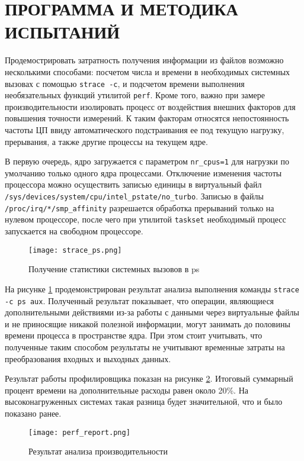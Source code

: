\pagebreak
\section{ПРОГРАММА И МЕТОДИКА ИСПЫТАНИЙ}
\label{sec:testing}

Продемострировать затратность получения информации из файлов возможно несколькими
способами: посчетом числа и времени в необходимых системных вызовах с помощью
\texttt{strace -c}, и подсчетом времени выполнения необязательных функций
утилитой \texttt{perf}. Кроме того, важно при замере производительности
изолировать процесс от воздействия внешних факторов для повышения точности
измерений. К таким факторам относятся непостоянность частоты ЦП ввиду
автоматического подстраивания ее под текущую нагрузку, прерывания, а также
другие процессы на текущем ядре.

В первую очередь, ядро загружается с параметром \texttt{nr\_cpus=1} для нагрузки
по умолчанию только одного ядра процессами.
Отключение изменения частоты процессора можно осуществить записью единицы в
виртуальный файл
\texttt{/sys/devices/system/cpu/intel\_pstate/no\_turbo}. Записью в файлы
\texttt{/proc/irq/*/smp\_affinity} разрешается обработка прерываний только на
нулевом процессоре, после чего при утилитой \texttt{taskset} необходимый
процесс запускается на свободном процессоре.

\begin{figure}
  \centering
  \texttt{[image: strace\_ps.png]}
  \caption{Получение статистики системных вызовов в ps}
  \label{fig:strace_ps}
\end{figure}

На рисунке \ref{fig:strace_ps}
продемонстрирован результат анализа выполнения команды
\texttt{strace -c ps aux}. Полученный результат
показывает, что операции, являющиеся дополнительными действиями из-за работы с
данными через виртуальные файлы и не приносящие никакой полезной информации,
могут занимать до половины времени процесса в пространстве ядра. При этом стоит
учитывать, что полученные таким способом результаты не учитывают временные
затраты на преобразования входных и выходных данных.

Результат работы профилировщика показан на рисунке \ref{fig:perf_report}.
Итоговый суммарный процент времени на дополнительные расходы равен около 20\%.
На высоконагруженных системах такая разница будет значительной, что и было
показано ранее.

\begin{figure}
  \centering
  \texttt{[image: perf\_report.png]}
  \caption{Результат анализа производительности}
  \label{fig:perf_report}
\end{figure}
